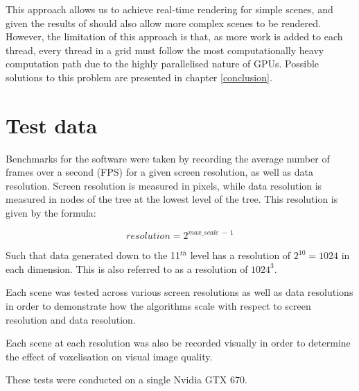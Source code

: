 This approach allows us to achieve real-time rendering for simple scenes, and given the results of \cite{laine10efficientsvos} should also allow more complex scenes to be rendered. However, the limitation of this approach is that, as more work is added to each thread, every thread in a grid must follow the most computationally heavy computation path due to the highly parallelised nature of GPUs. Possible solutions to this problem are presented in chapter \ref{conclusion}.

\section{Test data}
Benchmarks for the software were taken by recording the average number of frames over a second (FPS) for a given screen resolution, as well as data resolution. Screen resolution is measured in pixels, while data resolution is measured in nodes of the tree at the lowest level of the tree. This resolution is given by the formula:

\[
	resolution = 2^{max\_scale~ -~ 1}
\]

Such that data generated down to the 11$^{th}$ level has a resolution of $2^{10} = 1024$ in each dimension. This is also referred to as a resolution of $1024^3$.

Each scene was tested across various screen resolutions as well as data resolutions in order to demonstrate how the algorithms scale with respect to screen resolution and data resolution.

Each scene at each resolution was also be recorded visually in order to determine the effect of voxelisation on visual image quality.

These tests were conducted on a single Nvidia GTX 670.